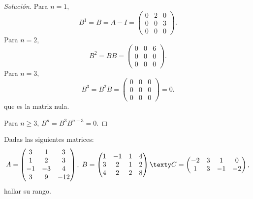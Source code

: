 \documentclass[a4,11pt]{aleph-notas}
\begin{document}
\begin{proof}[Solución]\hspace{0pt}
Para $n=1$,
    \[
        B^{1}=B=A-I= \begin{pmatrix}
            0 & 2 & 0 \\
            0 & 0 & 3 \\
            0 & 0 & 0
        \end{pmatrix}.
    \]
Para $n=2$, 
    \[
        B^{2}=B  B = \begin{pmatrix}
            0 & 0 & 6 \\
            0 & 0 & 0 \\
            0 & 0 & 0 
        \end{pmatrix}.
    \]
Para $n=3$, 
    \[
        B^{3}=B^{2} B= \begin{pmatrix}
            0 & 0 & 0 \\
            0 & 0 & 0 \\
            0 & 0 & 0
        \end{pmatrix} 
        = 0.
    \]
que es la matriz nula.

Para $n\geq 3$, $B^{n}=B^{3} B^{n-3}=0$.
\end{proof}

\begin{ejer}
    Dadas las siguientes matrices:
    \[
        A=
        \begin{pmatrix}
        3 & 1 & 3\\
        1 & 2 & 3\\
        -1 & -3 & 4\\
        3 & 9 & -12
        \end{pmatrix}
        , \hspace{0.1cm}
       B=
        \begin{pmatrix}
        1 & -1 & 1 & 4\\
        3 & 2 & 1 & 2\\
        4 & 2 & 2 & 8
        \end{pmatrix}
        \texty
        C=
        \begin{pmatrix}
        -2 & 3 & 1 &0\\
        1 & 3 & -1 & -2
        \end{pmatrix},
    \]
    hallar su rango.
\end{ejer}
\end{document}
